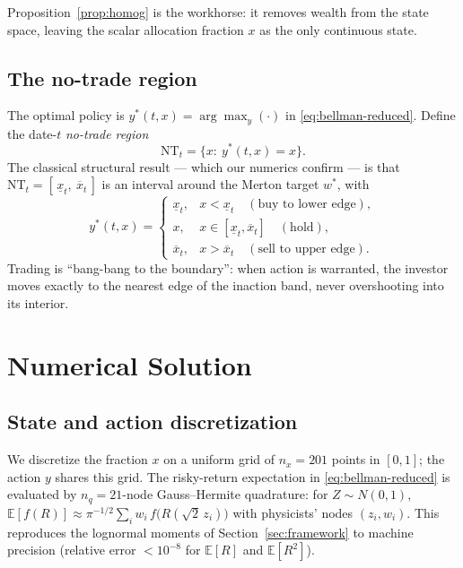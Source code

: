 \documentclass[11pt]{article}
\newcommand{\E}{\mathbb{E}}
\begin{document}
Proposition~\ref{prop:homog} is the workhorse: it removes wealth from the state
space, leaving the scalar allocation fraction $x$ as the only continuous state.

\subsection{The no-trade region}
The optimal policy is $y^{*}(t,x)=\arg\max_y(\cdot)$ in
\eqref{eq:bellman-reduced}. Define the date-$t$ \emph{no-trade region}
\begin{equation}
\mathrm{NT}_t=\{x:\ y^{*}(t,x)=x\}.
\end{equation}
The classical structural result --- which our numerics confirm --- is that
$\mathrm{NT}_t=[\,\underline{x}_t,\ \overline{x}_t\,]$ is an interval around the
Merton target $w^{*}$, with
\begin{equation}
y^{*}(t,x)=
\begin{cases}
\underline{x}_t, & x<\underline{x}_t \quad(\text{buy to lower edge}),\\
x, & x\in[\underline{x}_t,\overline{x}_t] \quad(\text{hold}),\\
\overline{x}_t, & x>\overline{x}_t \quad(\text{sell to upper edge}).
\end{cases}
\label{eq:bangbang}
\end{equation}
Trading is ``bang-bang to the boundary'': when action is warranted, the investor
moves exactly to the nearest edge of the inaction band, never overshooting into
its interior.

\section{Numerical Solution}
\label{sec:numerics}

\subsection{State and action discretization}
We discretize the fraction $x$ on a uniform grid of $n_x=201$ points in
$[0,1]$; the action $y$ shares this grid. The risky-return expectation in
\eqref{eq:bellman-reduced} is evaluated by $n_q=21$-node Gauss--Hermite
quadrature: for $Z\sim N(0,1)$,
$\E[f(R)]\approx\pi^{-1/2}\sum_i w_i\,f\!\big(R(\sqrt2\,z_i)\big)$ with
physicists' nodes $(z_i,w_i)$. This reproduces the lognormal moments of
Section~\ref{sec:framework} to machine precision (relative error
$<10^{-8}$ for $\E[R]$ and $\E[R^2]$).
\end{document}
